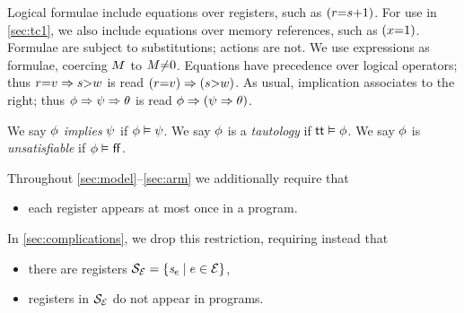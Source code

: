 
Logical formulae include equations over registers, such as
$(r{=}s{+}1)$.
For use in \textsection\ref{sec:tc1}, we also include equations over memory references, such as $(x{=}1)$.
Formulae are subject to substitutions; %
actions are not.
We use expressions as formulae, coercing $M$ to $M{\neq}0$.
Equations have precedence over logical operators; thus
$r{=}v\Rightarrow s{>}w$ is read
$(r{=}v)\Rightarrow(s{>}w)$.  As usual, implication associates to the
right; thus $\phi\Rightarrow\psi\Rightarrow\theta$ is read
$\phi\Rightarrow(\psi\Rightarrow\theta)$.

We say
$\phi$ \emph{implies} $\psi$ if $\phi\vDash\psi$.
We say
$\phi$ is a \emph{tautology} if $\mathsf{tt}\vDash\phi$.
We say
$\phi$ is \emph{unsatisfiable} if $\phi\vDash\mkern.6mu\mathsf{ff}\mkern.6mu$.


Throughout \textsection\ref{sec:model}--\ref{sec:arm} we 
additionally require that
\begin{itemize}
\item each register appears at most once in a program.
\end{itemize}
In \textsection\ref{sec:complications}, we drop this restriction, requiring
instead that
\begin{itemize}
\item there are registers
  $\mathcal{S}_{\mathcal{E}}=\{\mathit{s}_{e}\mid e\in\mathcal{E}\}$,
\item registers in $\mathcal{S}_{\mathcal{E}}$ do not appear in programs.
\end{itemize}

